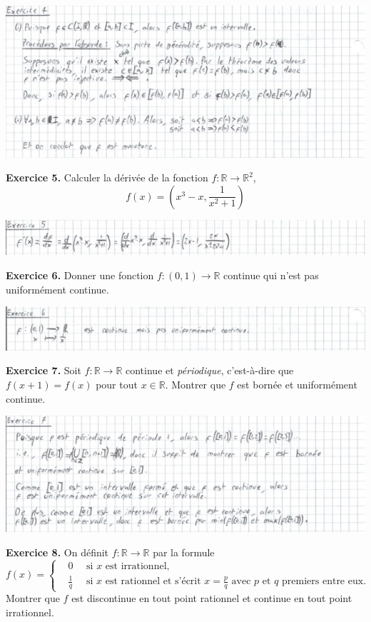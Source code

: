 \documentclass[a4paper, 10pt]{report}
\begin{document}
	\includegraphics{ex04.jpg}
		
	\newpage
	
	\noindent
	\textbf{Exercice 5.} Calculer la dérivée de la fonction
	$f: \mathbb{R} \to \mathbb{R}^2$,
	\[f(x) = \left(x^3 - x, \frac{1}{x^2 + 1}\right)\]
	
	\includegraphics{ex05.jpg}
		
	\vspace{5mm}
	\noindent
	\textbf{Exercice 6.} Donner une fonction $f: (0, 1) \to \mathbb{R}$
	continue qui n'est pas uniformément continue.
	
	\includegraphics{ex06.jpg}
		
	\vspace{5mm}	
	\noindent
	\textbf{Exercice 7.} Soit $f: \mathbb{R} \to \mathbb{R}$ continue
	et \textit{périodique}, c'est-à-dire que $f(x+1) = f(x)$ pour
	tout $x \in \mathbb{R}$. Montrer que $f$ est bornée et
	uniformément continue.
	
	\includegraphics{ex07.jpg}
		
	\vspace{5mm}	
	\noindent
	\textbf{Exercice 8.} On définit $f: \mathbb{R} \to \mathbb{R}$ par
	la formule
	\[
		f(x) = \left\{\begin{aligned}
			&0\quad \text{ si $x$ est irrationnel,}\\
			&\tfrac{1}{q}\quad \text{ si $x$ est rationnel et s'écrit
				$x = \tfrac{p}{q}$ avec $p$ et $q$ premiers entre eux.}
		\end{aligned}\right.
	\]
	Montrer que $f$ est discontinue en tout point rationnel et continue
	en tout point irrationnel.
	
\end{document}

